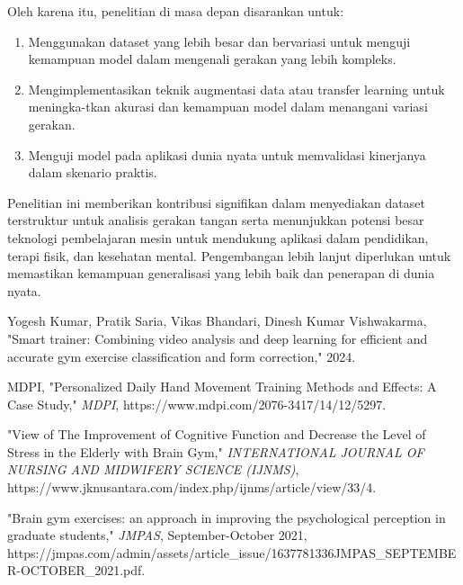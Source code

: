 \documentclass[12pt,a4paper]{article}
\begin{document}
Oleh karena itu, penelitian di masa depan disarankan untuk:
\begin{enumerate}
    \item Menggunakan dataset yang lebih besar dan bervariasi untuk menguji kemampuan model dalam mengenali gerakan yang lebih kompleks.
    \item Mengimplementasikan teknik augmentasi data atau transfer learning untuk meningka-tkan akurasi dan kemampuan model dalam menangani variasi gerakan.
    \item Menguji model pada aplikasi dunia nyata untuk memvalidasi kinerjanya dalam skenario praktis.
\end{enumerate}

Penelitian ini memberikan kontribusi signifikan dalam menyediakan dataset terstruktur untuk analisis gerakan tangan serta menunjukkan potensi besar teknologi pembelajaran mesin untuk mendukung aplikasi dalam pendidikan, terapi fisik, dan kesehatan mental. Pengembangan lebih lanjut diperlukan untuk memastikan kemampuan generalisasi yang lebih baik dan penerapan di dunia nyata.

\newpage

\begin{thebibliography}{9}

 Yogesh Kumar, Pratik Saria, Vikas Bhandari, Dinesh Kumar Vishwakarma, "Smart trainer: Combining video analysis and deep learning for efficient and accurate gym exercise classification and form correction," 2024.

 MDPI, "Personalized Daily Hand Movement Training Methods and Effects: A Case Study," \textit{MDPI}, https://www.mdpi.com/2076-3417/14/12/5297.

 "View of The Improvement of Cognitive Function and Decrease the Level of Stress in the Elderly with Brain Gym," \textit{INTERNATIONAL JOURNAL OF NURSING AND MIDWIFERY SCIENCE (IJNMS)}, https://www.jknusantara.com/index.php/ijnms/article/view/33/4.

 "Brain gym exercises: an approach in improving the psychological perception in graduate students," \textit{JMPAS}, September-October 2021, https://jmpas.com/admin/assets/article\_issue/1637781336JMPAS\_SEPTEMBER-OCTOBER\_2021.pdf.

\end{thebibliography}
\end{document}
